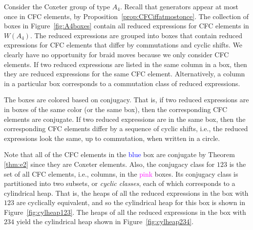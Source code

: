 \begin{example}\label{ex:A4boxes} Consider the Coxeter group of type $A_4$. Recall that generators appear at most once in CFC elements, by Proposition~\ref{prop:CFCiffatmostonce}.
    The collection of boxes in Figure~\ref{fig:A4boxes} contain all reduced expressions for CFC elements in $W(A_4)$.
    The reduced expressions are grouped into boxes that contain reduced expressions for CFC elements that differ by commutations and cyclic shifts. We clearly have no opportunity for braid moves because we only consider CFC elements.
    If two reduced expressions are listed in the same column in a box, then they are reduced expressions for the same CFC element. Alternatively, a column in a particular box corresponds to a commutation class of reduced expressions.
    
    The boxes are colored based on conjugacy. That is, if two reduced expressions are in boxes of the same color (or the same box), then the corresponding CFC elements are conjugate.
    If two reduced expressions are in the same box, then the corresponding CFC elements differ by a sequence of cyclic shifts, i.e., the reduced expressions look the same, up to commutation, when written in a circle.
    
    Note that all of the CFC elements in the \textcolor{blue}{blue} box are conjugate by Theorem \ref{thm:e2} since they are Coxeter elements.
    Also, the conjugacy class for $123$ is the set of all CFC elements, i.e., columns, in the \textcolor{magenta}{pink} boxes. Its conjugacy class is partitioned into two subsets, or \emph{cyclic classes}, each of which corresponds to a cylindrical heap.
    That is, the heaps of all the reduced expressions in the box with $123$ are cyclically equivalent, and so the cylindrical heap for this box is shown in Figure~\ref{fig:cylheap123}.
    The heaps of all the reduced expressions in the box with $234$ yield the cylindrical heap shown in Figure~\ref{fig:cylheap234}.


\end{example}
